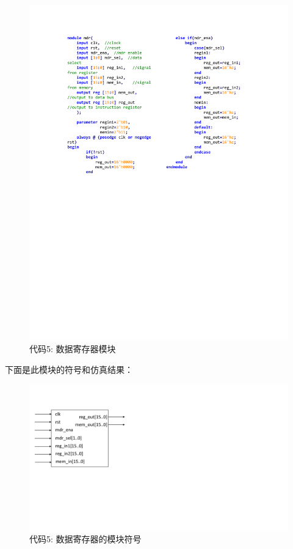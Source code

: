 \documentclass[titlepage, 11pt]{article}
\begin{document}
		\begin{figure}[H]
			\centering
			\includegraphics[scale=0.856]{22.pdf}
			\caption*{代码5: 数据寄存器模块}
		\end{figure}
		下面是此模块的符号和仿真结果：
		\begin{figure}[H]
			\centering
			\includegraphics[scale=0.5]{23.pdf}
			\caption*{代码5: 数据寄存器的模块符号}
		\end{figure}
\end{document}
